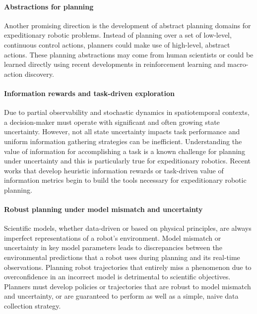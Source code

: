 \paragraph{Abstractions for planning}
Another promising direction is the development of abstract planning domains for expeditionary robotic problems. Instead of planning over a set of low-level, continuous control actions, planners could make use of high-level, abstract actions. These planning abstractions may come from human scientists or could be learned directly using recent developments in reinforcement learning and macro-action discovery\autocite{liu2017learning}.

\paragraph{Information rewards and task-driven exploration}
Due to partial observability and stochastic dynamics in spatiotemporal contexts, a decision-maker must operate with significant and often growing state uncertainty. However, not all state uncertainty impacts task performance and uniform information gathering strategies can be inefficient. Understanding the value of information for accomplishing a task is a known challenge for planning under uncertainty and this is particularly true for expeditionary robotics. Recent works that develop heuristic information rewards\autocite{flaspohler2019information} or task-driven value of information metrics\autocite{flaspohler2020belief} begin to build the tools necessary for expeditionary robotic planning.

\paragraph{Robust planning under model mismatch and uncertainty}
Scientific models, whether data-driven or based on physical principles, are always imperfect representations of a robot's environment. Model mismatch or uncertainty in key model parameters leads to discrepancies between the environmental predictions that a robot uses during planning and its real-time observations\autocite{singh2018robust}. Planning robot trajectories that entirely miss a phenomenon due to overconfidence in an incorrect model is detrimental to scientific objectives. Planners must develop policies or trajectories that are robust to model mismatch and uncertainty, or are guaranteed to perform as well as a simple, naive data collection strategy. 

